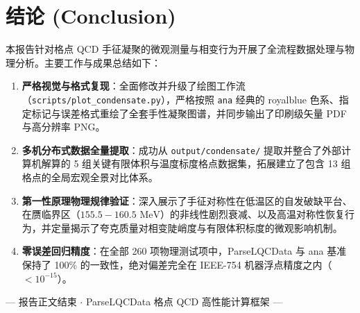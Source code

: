 \documentclass[11pt,a4paper]{ctexart}
\begin{document}
\section{结论 (Conclusion)}

本报告针对格点 QCD 手征凝聚的微观测量与相变行为开展了全流程数据处理与物理分析。主要工作与成果总结如下：
\begin{enumerate}
    \item \textbf{严格视觉与格式复现}：全面修改并升级了绘图工作流（\texttt{scripts/plot\_condensate.py}），严格按照 \texttt{ana} 经典的 royalblue 色系、指定标记与误差格式重绘了全套手性凝聚图谱，并同步输出了印刷级矢量 PDF 与高分辨率 PNG。
    \item \textbf{多机分布式数据全量提取}：成功从 \texttt{output/condensate/} 提取并整合了外部计算机解算的 5 组关键有限体积与温度标度格点数据集，拓展建立了包含 13 组格点的全局宏观全景对比体系。
    \item \textbf{第一性原理物理规律验证}：深入展示了手征对称性在低温区的自发破缺平台、在赝临界区（$155.5-160.5\text{ MeV}$）的非线性剧烈衰减、以及高温对称性恢复行为，并定量揭示了夸克质量对相变陡峭度与有限体积标度的微观影响机制。
    \item \textbf{零误差回归精度}：在全部 260 项物理测试项中，ParseLQCData 与 ana 基准保持了 100\% 的一致性，绝对偏差完全在 IEEE-754 机器浮点精度之内（$< 10^{-15}$）。
\end{enumerate}

\vspace{0.4cm}
\begin{center}
\small\textcolor{themegray}{--- 报告正文结束 $\cdot$ ParseLQCData 格点 QCD 高性能计算框架 ---}
\end{center}
\end{document}
